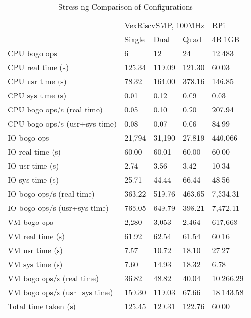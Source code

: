 \begin{table*}[ht]
    \centering
    \caption{Stress-ng Comparison of Configurations}
    \begin{tabular}{lllll}
                                  & \multicolumn{3}{l}{VexRiscvSMP, 100MHz} & RPi       \\ \cline{2-5} 
                                  & Single      & Dual        & Quad        & 4B 1GB    \\ \hline
    CPU bogo ops                  & 6           & 12          & 24          & 12,483    \\ \hline
    CPU real time (s)             & 125.34      & 119.09      & 121.30      & 60.03     \\
    CPU usr time (s)              & 78.32       & 164.00      & 378.16      & 146.85    \\
    CPU sys time (s)              & 0.01        & 0.12        & 0.09        & 0.03      \\
    CPU bogo ops/s (real time)    & 0.05        & 0.10        & 0.20        & 207.94    \\
    CPU bogo ops/s (usr+sys time) & 0.08        & 0.07        & 0.06        & 84.99     \\ \hline
    IO bogo ops                   & 21,794      & 31,190      & 27,819      & 440,066   \\ \hline
    IO real time (s)              & 60.00       & 60.01       & 60.00       & 60.00     \\
    IO usr time (s)               & 2.74        & 3.56        & 3.42        & 10.34     \\
    IO sys time (s)               & 25.71       & 44.44       & 66.44       & 48.56     \\
    IO bogo ops/s (real time)     & 363.22      & 519.76      & 463.65      & 7,334.31  \\
    IO bogo ops/s (usr+sys time)  & 766.05      & 649.79      & 398.21      & 7,472.11  \\ \hline
    VM bogo ops                   & 2,280       & 3,053       & 2,464       & 617,668   \\ \hline
    VM real time (s)              & 61.92       & 62.54       & 61.54       & 60.16     \\
    VM usr time (s)               & 7.57        & 10.72       & 18.10       & 27.27     \\
    VM sys time (s)               & 7.60        & 14.93       & 18.32       & 6.78      \\
    VM bogo ops/s (real time)     & 36.82       & 48.82       & 40.04       & 10,266.29 \\
    VM bogo ops/s (usr+sys time)  & 150.30      & 119.03      & 67.66       & 18,143.58 \\ \hline
    Total time taken (s)          & 125.45      & 120.31      & 122.76      & 60.00     \\ \hline
    \end{tabular}
    \label{stress1} 
\end{table*}

